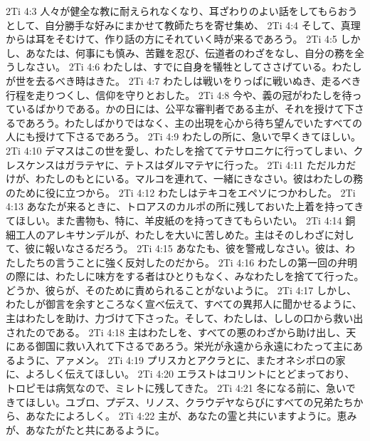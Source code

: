 2Ti 4:3  人々が健全な教に耐えられなくなり、耳ざわりのよい話をしてもらおうとして、自分勝手な好みにまかせて教師たちを寄せ集め、
2Ti 4:4  そして、真理からは耳をそむけて、作り話の方にそれていく時が来るであろう。
2Ti 4:5  しかし、あなたは、何事にも慎み、苦難を忍び、伝道者のわざをなし、自分の務を全うしなさい。
2Ti 4:6  わたしは、すでに自身を犠牲としてささげている。わたしが世を去るべき時はきた。
2Ti 4:7  わたしは戦いをりっぱに戦いぬき、走るべき行程を走りつくし、信仰を守りとおした。
2Ti 4:8  今や、義の冠がわたしを待っているばかりである。かの日には、公平な審判者である主が、それを授けて下さるであろう。わたしばかりではなく、主の出現を心から待ち望んでいたすべての人にも授けて下さるであろう。
2Ti 4:9  わたしの所に、急いで早くきてほしい。
2Ti 4:10  デマスはこの世を愛し、わたしを捨ててテサロニケに行ってしまい、クレスケンスはガラテヤに、テトスはダルマテヤに行った。
2Ti 4:11  ただルカだけが、わたしのもとにいる。マルコを連れて、一緒にきなさい。彼はわたしの務のために役に立つから。
2Ti 4:12  わたしはテキコをエペソにつかわした。
2Ti 4:13  あなたが来るときに、トロアスのカルポの所に残しておいた上着を持ってきてほしい。また書物も、特に、羊皮紙のを持ってきてもらいたい。
2Ti 4:14  銅細工人のアレキサンデルが、わたしを大いに苦しめた。主はそのしわざに対して、彼に報いなさるだろう。
2Ti 4:15  あなたも、彼を警戒しなさい。彼は、わたしたちの言うことに強く反対したのだから。
2Ti 4:16  わたしの第一回の弁明の際には、わたしに味方をする者はひとりもなく、みなわたしを捨てて行った。どうか、彼らが、そのために責められることがないように。
2Ti 4:17  しかし、わたしが御言を余すところなく宣べ伝えて、すべての異邦人に聞かせるように、主はわたしを助け、力づけて下さった。そして、わたしは、ししの口から救い出されたのである。
2Ti 4:18  主はわたしを、すべての悪のわざから助け出し、天にある御国に救い入れて下さるであろう。栄光が永遠から永遠にわたって主にあるように、アァメン。
2Ti 4:19  プリスカとアクラとに、またオネシポロの家に、よろしく伝えてほしい。
2Ti 4:20  エラストはコリントにとどまっており、トロピモは病気なので、ミレトに残してきた。
2Ti 4:21  冬になる前に、急いできてほしい。ユブロ、プデス、リノス、クラウデヤならびにすべての兄弟たちから、あなたによろしく。
2Ti 4:22  主が、あなたの霊と共にいますように。恵みが、あなたがたと共にあるように。


